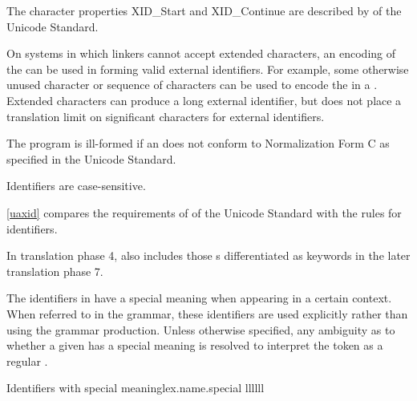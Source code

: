 \pnum
{}%
%
\begin{note}
The character properties XID_Start and XID_Continue are described by  of the Unicode Standard.
\begin{footnote}
On systems in which linkers cannot accept extended
characters, an encoding of the  can be used in
forming valid external identifiers. For example, some otherwise unused
character or sequence of characters can be used to encode the
 in a . Extended
characters can produce a long external identifier, but \Cpp{} does not
place a translation limit on significant characters for external
identifiers.
\end{footnote}
\end{note}
The program is ill-formed
if an  does not conform to
Normalization Form C as specified in the Unicode Standard.
\begin{note}
Identifiers are case-sensitive.
\end{note}
\begin{note}
\ref{uaxid} compares the requirements of  of the Unicode Standard
with the \Cpp{} rules for identifiers.
\end{note}
\begin{note}
In translation phase 4,
 also includes
those s
differentiated as keywords
in the later translation phase 7.
\end{note}

\pnum
{}%
%
%
%
The identifiers in  have a special meaning when
appearing in a certain context. When referred to in the grammar, these identifiers
are used explicitly rather than using the  grammar production.
Unless otherwise specified, any ambiguity as to whether a given
 has a special meaning is resolved to interpret the
token as a regular .

\begin{multicolfloattable}{Identifiers with special meaning}{lex.name.special}
{llllll}
           \\
\columnbreak
{}          \\
\columnbreak
{}          \\
\columnbreak
{}        \\
\columnbreak
{}            \\
\columnbreak
{}             \\
\end{multicolfloattable}

